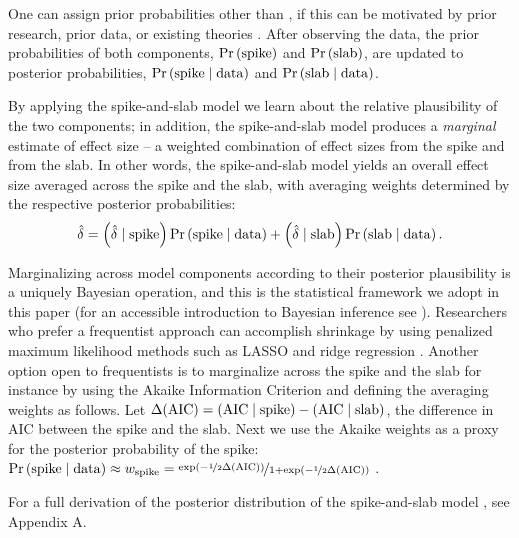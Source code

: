 \documentclass[a4paper]{article}
\newcommand{\EJ}[1]{\todo[inline, color=green]{  #1 }}
\newcommand{\shypo}[1]{%
	\ifnum#1>0%
		\mathrm{slab}
	\else%
		\mathrm{spike}
	\fi%
}
\newcommand{\data}{\mathrm{data}}%
\newcommand{\obsDelta}{\hat{\delta}}
\newcommand{\probo}{\mathrm{Pr}}
\newcommand{\prob}[1]{\probo\left(#1\right)}
\newcommand{\AIC}{\mathrm{AIC}}
\newcommand{\DeltaAIC}{\Delta(\AIC)}
\newenvironment{revision}{\color{teal}}{\color{black}}
\begin{document}
\begin{revision}%
One can assign prior probabilities other than , if this can be motivated by prior research, prior data, or existing theories \parencite[e.g., ][]{wilson2018prior}.
After observing the data, the prior probabilities of both components, $\prob{\shypo{0}}$ and $\prob{\shypo{1}}$, are updated to posterior probabilities, $\prob{\shypo{0}\mid\data}$ and $\prob{\shypo{1}\mid\data}$.

By applying the spike-and-slab model we learn about the relative plausibility of the two components; in addition, the spike-and-slab model produces a \emph{marginal} estimate of effect size -- a weighted combination of effect sizes from the spike and from the slab. In other words, the spike-and-slab model yields an overall effect size averaged across the spike and the slab, with averaging weights determined by the respective posterior probabilities: 
\begin{align*}
	\obsDelta = \left(\obsDelta\mid\shypo{0}\right)\prob{\shypo{0}\mid\data} + \left(\obsDelta\mid\shypo{1}\right)\prob{\shypo{1}\mid\data}.
\end{align*}

Marginalizing across model components according to their posterior plausibility is a uniquely Bayesian operation, and this is the statistical framework we adopt in this paper (for an accessible introduction to Bayesian inference see \citeauthor{VandekerckhoveEtAl2018SI}). Researchers who prefer a frequentist approach can accomplish shrinkage by using penalized maximum likelihood methods such as LASSO and ridge regression \parencite{tibshirani2005sparsity}. Another option open to frequentists is to marginalize across the spike and the slab for instance by using the Akaike Information Criterion \parencite[AIC;][]{Akaike1973} and defining the averaging weights as follows. Let $\DeltaAIC = \left(\AIC\mid\shypo{0}\right) - \left(\AIC\mid\shypo{1}\right)$, the difference in AIC between the spike and the slab. Next we use the Akaike weights as a proxy for the posterior probability of the spike:
$\prob{\shypo{0}\mid\data} \approx w_{\shypo{0}} = \nicefrac{\exp\left(-\nicefrac{1}{2}\DeltaAIC\right)}{1 + \exp\left(-\nicefrac{1}{2}\DeltaAIC\right)}$ \parencite{WagenmakersFarrell2004, BurnhamAnderson2002}. 

For a full derivation of the posterior distribution of the spike-and-slab model \EJ{Welke?}, see Appendix A.%
\end{revision}
\EJ{HERE}
\end{document}
